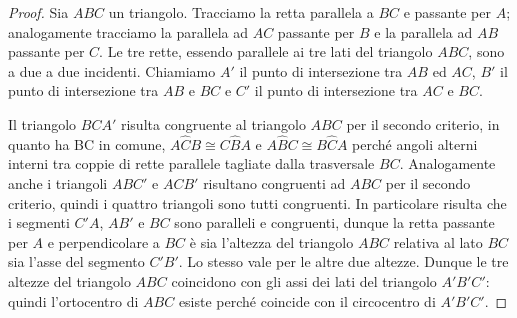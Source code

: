 \begin{figure}[htb]
	\centering
\end{figure}

\begin{proof}
Sia $ABC$ un triangolo. Tracciamo la retta parallela a $BC$ e passante per $A$; analogamente tracciamo la parallela ad $AC$ passante per $B$ e la parallela ad $AB$ passante per $C$. Le tre rette, essendo parallele ai tre lati del triangolo $ABC$, sono a due a due incidenti. Chiamiamo $A'$ il punto di intersezione tra $AB$ ed $AC$, $B'$ il punto di intersezione tra $AB$ e $BC$ e $C'$ il punto di intersezione tra $AC$ e $BC$.

Il triangolo $BCA'$ risulta congruente al triangolo $ABC$ per il secondo criterio, in quanto ha BC in comune, $A\widehat{C}B\cong C\widehat{B}A$ e $A\widehat{B}C\cong B\widehat{C}A$ perché angoli alterni interni tra coppie di rette parallele tagliate dalla trasversale $BC$. Analogamente anche i triangoli $ABC'$ e $ACB'$ risultano congruenti ad $ABC$ per il secondo criterio, quindi i quattro triangoli sono tutti congruenti. In particolare risulta che i segmenti $C'A$, $AB'$ e $BC$ sono paralleli e congruenti, dunque la retta passante per $A$ e perpendicolare a $BC$ è sia l'altezza del triangolo $ABC$ relativa al lato $BC$ sia l'asse del segmento $C'B'$. Lo stesso vale per le altre due altezze. Dunque le tre altezze del triangolo $ABC$ coincidono con gli assi dei lati del triangolo $A'B'C'$: quindi l'ortocentro di $ABC$ esiste perché coincide con il circocentro di $A'B'C'$.
\end{proof}

